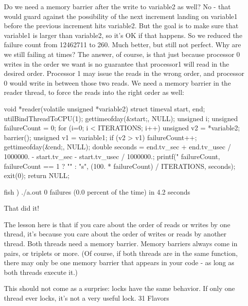 {{{{Do we need a memory barrier after the write to variable2 as well? No - that would guard against the possibility of the next increment landing on variable1 before the previous increment hits variable2. But the goal is to make sure that variable1 is larger than variable2, so it's OK if that happens.
So we reduced the failure count from 12462711 to 260. Much better, but still not perfect. Why are we still failing at times? The answer, of course, is that just because processor 0 writes in the order we want is no guarantee that processor1 will read in the desired order. Processor 1 may issue the reads in the wrong order, and processor 0 would write in between those two reads. We need a memory barrier in the reader thread, to force the reads into the right order as well:

void *reader(volatile unsigned *variable2) {
        struct timeval start, end;
        utilBindThreadToCPU(1);
        gettimeofday(&start;, NULL);
        unsigned i;
        unsigned failureCount = 0;
        for (i=0; i < ITERATIONS; i++) {
                unsigned v2 = *variable2;
                barrier();
                unsigned v1 = variable1;
                if (v2 > v1) failureCount++;
        }
        gettimeofday(&end;, NULL);
        double seconds = end.tv_sec + end.tv_usec / 1000000. - start.tv_sec - start.tv_usec / 1000000.;
        printf("%
               failureCount, failureCount == 1 ? "" : "s",
               (100. * failureCount) / ITERATIONS, seconds);
        exit(0);
        return NULL;
}

fish ) ./a.out
0 failures (0.0 percent of the time) in 4.2 seconds

That did it!

The lesson here is that if you care about the order of reads or writes by one thread, it's because you care about the order of writes or reads by another thread. Both threads need a memory barrier. Memory barriers always come in pairs, or triplets or more. (Of course, if both threads are in the same function, there may only be one memory barrier that appears in your code - as long as both threads execute it.)

This should not come as a surprise: locks have the same behavior. If only one thread ever locks, it's not a very useful lock.
31 Flavors

}}}}
